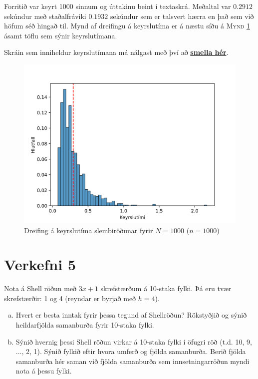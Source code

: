 \documentclass[12pt, a4paper, hidelinks]{article}
\begin{document}
\noindent
Forritið var keyrt 1000 sinnum og úttakinu beint í textaskrá. Meðaltal var $0.2912$ sekúndur með staðalfráviki $0.1932$ sekúndur
sem er talsvert hærra en það sem við höfum séð hingað til. Mynd af dreifingu á keyrslutíma er á næstu síðu á \textsc{Mynd} \ref{mynd:Keyrslutimi_RandomSort}
ásamt töflu sem sýnir keyrslutímana.

Skráin sem inniheldur keyrslutímana má nálgast með því að \href{https://raw.githubusercontent.com/lvthnn/TOL203G/master/HD4/src/V5/data_randomsort.txt}{\bfseries smella hér}.

\begin{figure}
    \centering
    \includegraphics[width=\textwidth]{img/RandomSort_1Kints.png}
    \caption{Dreifing á keyrslutíma slembiröðunar fyrir $N = 1000$ ($n = 1000$)}
    \label{mynd:Keyrslutimi_RandomSort}
\end{figure}

\newpage

\section*{Verkefni 5}
Nota á Shell röðun með $3x + 1$ skrefstærðum á 10-staka fylki. Þá eru tvær skrefstærðir: 1 og 4 (reyndar er byrjað með $h = 4$).
\begin{enumerate}[(a)]
    \item Hvert er besta inntak fyrir þessa tegund af Shellröðun? Rökstyðjið og sýnið heildarfjölda
    samanburða fyrir 10-staka fylki.
    \item Sýnið hvernig þessi Shell röðun virkar á 10-staka fylki í öfugri röð (t.d. 10, 9, $\ldots$\@ , 2, 1).
    Sýnið fylkið eftir hvora umferð og fjölda samanburða. Berið fjölda samanburða hér saman við fjölda samanburða
    sem innsetningarröðun myndi nota á þessu fylki.
\end{enumerate}
\end{document}
